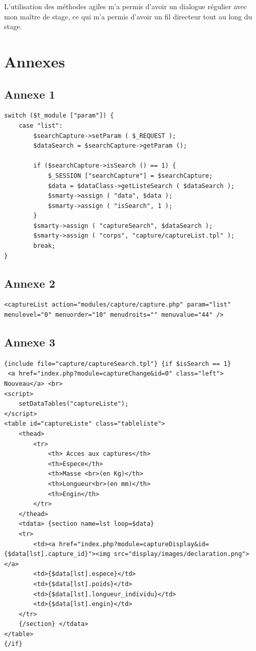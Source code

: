 \documentclass[12pt,a4paper,titlepage,twoside]{report}
\begin{document}
L'utilisation des méthodes agiles m'a permis d'avoir un dialogue régulier avec mon maître de stage, ce qui m'a permis d'avoir un fil directeur tout au long du stage.

   	
\chapter{Annexes}
\section{Annexe 1}
\lstset{language=PHP}
\begin{lstlisting}[frame=single]
switch ($t_module ["param"]) {
	case "list":
		$searchCapture->setParam ( $_REQUEST );
		$dataSearch = $searchCapture->getParam ();

		if ($searchCapture->isSearch () == 1) {
			$_SESSION ["searchCapture"] = $searchCapture;
			$data = $dataClass->getListeSearch ( $dataSearch );			
			$smarty->assign ( "data", $data );
			$smarty->assign ( "isSearch", 1 );
		}
		$smarty->assign ( "captureSearch", $dataSearch );
		$smarty->assign ( "corps", "capture/captureList.tpl" );
		break;
}
\end{lstlisting}
\section{Annexe 2}
\lstset{language=XML}
\begin{lstlisting}[frame=single]
<captureList action="modules/capture/capture.php" param="list" menulevel="0" menuorder="10" menudroits="" menuvalue="44" />
\end{lstlisting}
\section{Annexe 3}
\lstset{language=HTML}
\begin{lstlisting}[frame=single]
{include file="capture/captureSearch.tpl"} {if $isSearch == 1}
 <a href="index.php?module=captureChange&id=0" class="left"> Nouveau</a> <br>
<script>
	setDataTables("captureListe");
</script>
<table id="captureListe" class="tableliste">
	<thead>
		<tr>
			<th> Acces aux captures</th>
			<th>Espece</th>
			<th>Masse <br>(en Kg)</th>
			<th>Longueur<br>(en mm)</th>
			<th>Engin</th>
		</tr>
	</thead>
	<tdata> {section name=lst loop=$data}
	<tr>
		<td><a href="index.php?module=captureDisplay&id={$data[lst].capture_id}"><img src="display/images/declaration.png"></a>
		<td>{$data[lst].espece}</td>
		<td>{$data[lst].poids}</td>
		<td>{$data[lst].longueur_individu}</td>
		<td>{$data[lst].engin}</td>
	</tr>
	{/section} </tdata>
</table>
{/if}
\end{lstlisting}
\end{document}

